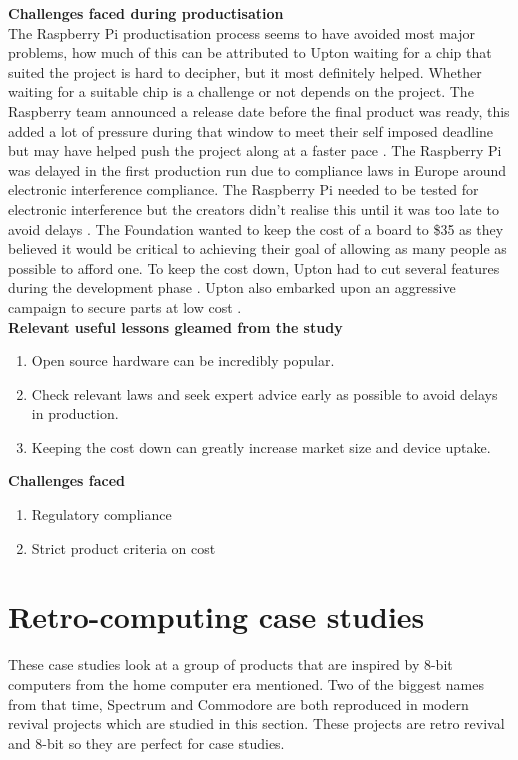 \textbf{Challenges faced during productisation}\\
The Raspberry Pi productisation process seems to have avoided most major problems, how much of this can be attributed to Upton waiting for a chip that suited the project is hard to decipher, but it most definitely helped. Whether waiting for a suitable chip is a challenge or not depends on the project.
The Raspberry team announced a release date before the final product was ready, this added a lot of pressure during that window to meet their self imposed deadline but may have helped push the project along at a faster pace 
\cite{RN97}. 
The Raspberry Pi was delayed in the first production run due to compliance laws in Europe around electronic interference compliance. The Raspberry Pi needed to be tested for electronic interference but the creators didn't realise this until it was too late to avoid delays 
\cite{RN98}. The Foundation wanted to keep the cost of a board to \$35 as they believed it would be critical to achieving their goal of allowing as many people as possible to afford one. To keep the cost down, Upton had to cut several features during the development phase 
\cite{RN98}. Upton also embarked upon an aggressive campaign to secure parts at low cost 
\cite{RN98}.\\

\textbf{Relevant useful lessons gleamed from the study}
\begin{enumerate}
\item Open source hardware can be incredibly popular. 
\item Check relevant laws and seek expert advice early as possible to avoid delays in production.
\item Keeping the cost down can greatly increase market size and device uptake. \\
\end{enumerate}

\textbf{Challenges faced}
\begin{enumerate}
\item Regulatory compliance
\item Strict product criteria on cost
\end{enumerate}

\section{Retro-computing case studies}
These case studies look at a group of products that are inspired by 8-bit computers from the home computer era mentioned. Two of the biggest names from that time, Spectrum and Commodore are both reproduced in modern revival projects which are studied in this section. These projects are retro revival and 8-bit so they are perfect for case studies.

